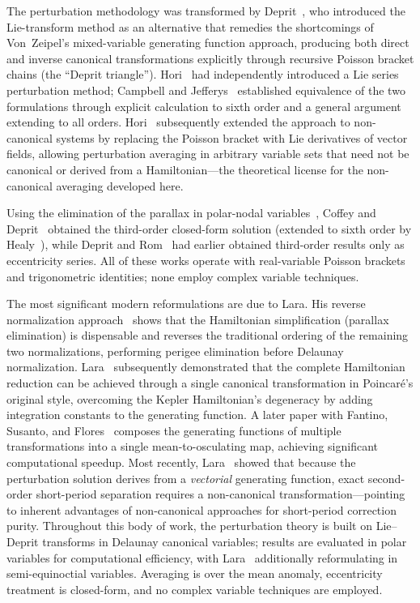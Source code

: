 The perturbation methodology was transformed by Deprit~\cite{deprit1969},
who introduced the Lie-transform method as an alternative that remedies
the shortcomings of Von~Zeipel's mixed-variable generating function
approach, producing both direct and inverse canonical transformations
explicitly through recursive Poisson bracket chains (the ``Deprit
triangle'').  Hori~\cite{hori1966} had independently introduced a Lie
series perturbation method; Campbell and Jefferys~\cite{campbell1970}
established equivalence of the two formulations through explicit
calculation to sixth order and a general argument extending to all orders.
Hori~\cite{hori1971} subsequently extended the approach to non-canonical
systems by replacing the Poisson bracket with Lie derivatives of vector
fields, allowing perturbation averaging in arbitrary variable sets that
need not be canonical or derived from a Hamiltonian---the theoretical
license for the non-canonical averaging developed here.

Using the elimination of the parallax in polar-nodal
variables~\cite{deprit1981}, Coffey and Deprit~\cite{coffey1982} obtained
the third-order closed-form solution (extended to sixth order by
Healy~\cite{healy2000}), while Deprit and Rom~\cite{depritrom1970} had
earlier obtained third-order results only as eccentricity series.  All of
these works operate with real-variable Poisson brackets and trigonometric
identities; none employ complex variable techniques.

The most significant modern reformulations are due to Lara.  His reverse normalization approach~\cite{lara2020} shows that the
Hamiltonian simplification (parallax elimination) is dispensable and
reverses the traditional ordering of the remaining two normalizations,
performing perigee elimination before Delaunay normalization.
Lara~\cite{lara2021} subsequently demonstrated that the complete
Hamiltonian reduction can be achieved through a single canonical
transformation in Poincar\'e's original style, overcoming the Kepler
Hamiltonian's degeneracy by adding integration constants to the generating
function.  A later paper with Fantino, Susanto, and
Flores~\cite{lara2024} composes the generating functions of multiple
transformations into a single mean-to-osculating map, achieving significant
computational speedup.  Most recently, Lara~\cite{lara2025} showed that
because the
perturbation solution derives from a \emph{vectorial} generating function,
exact second-order short-period separation requires a non-canonical
transformation---pointing to inherent advantages of non-canonical
approaches for short-period correction purity.
Throughout this body of work, the perturbation theory is built on
Lie--Deprit transforms in Delaunay canonical variables; results are
evaluated in polar variables for computational efficiency, with
Lara~\cite{lara2025} additionally reformulating in semi-equinoctial
variables.  Averaging is over the mean anomaly, eccentricity treatment
is closed-form, and no complex variable techniques are employed.

